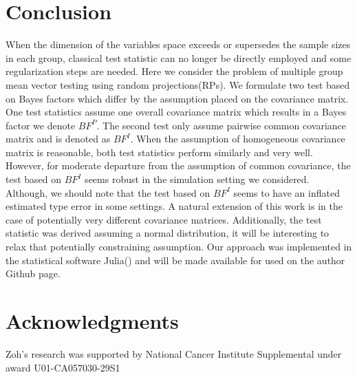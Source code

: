 \documentclass[12pt]{article}
\theoremstyle{plain}%
\theoremstyle{definition}
\begin{document}
\section{Conclusion} \label{sec:conclusion}
When the dimension of the variables space exceeds or supersedes the sample sizes in each group, classical test statistic can no longer be directly employed and some regularization steps are needed. Here we consider the problem of multiple group mean vector testing using random projections(RPs). We formulate two test based on Bayes factors which differ by the assumption placed on the covariance matrix. One test statistics assume one overall covariance matrix which results in a Bayes factor we denote $BF^{P}$. The second test only assume pairwise common covariance matrix and is denoted as $BF^{I}$. When the assumption of homogeneous covariance matrix is reasonable, both test statistics perform similarly and very well. However, for moderate departure from the assumption of common covariance, the test based on $BF^{I}$ seems robust in the simulation setting we considered. Although, we should note that the test based on $BF^{I}$ seems to have an inflated estimated type error in some settings.  A natural extension of this work is in the case of potentially very different covariance matrices. Additionally, the test statistic was derived assuming a normal distribution, it will be interesting to relax that potentially constraining assumption. Our approach was implemented in the statistical software \textsf{Julia}(\cite{bezanson2012julia}) and will be made available for used on the author Github page.   

\section*{Acknowledgments}
Zoh's research was supported by National Cancer Institute Supplemental under award U01-CA057030-29S1



\end{document}
